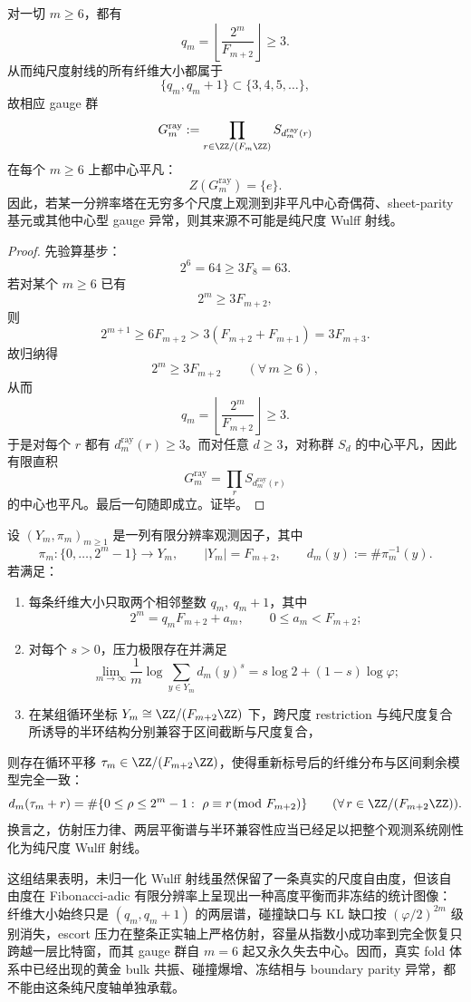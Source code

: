 \begin{proposition}\label{prop:conclusion-serrin-wulff-ray-eventual-centerless-gauge}
对一切 \(m\ge 6\)，都有
\[
q_m=\left\lfloor\frac{2^m}{F_{m+2}}\right\rfloor\ge 3.
\]
从而纯尺度射线的所有纤维大小都属于
\[
\{q_m,q_m+1\}\subset \{3,4,5,\dots\},
\]
故相应 gauge 群
\[
G_m^{\mathrm{ray}}
:=
\prod_{r\in \ZZ/(F_m\ZZ)}S_{d_m^{\mathrm{ray}}(r)}
\]
在每个 \(m\ge 6\) 上都中心平凡：
\[
Z(G_m^{\mathrm{ray}})=\{e\}.
\]
因此，若某一分辨率塔在无穷多个尺度上观测到非平凡中心奇偶荷、sheet-parity 基元或其他中心型 gauge 异常，则其来源不可能是纯尺度 Wulff 射线。
\end{proposition}
\begin{proof}
先验算基步：
\[
2^6=64\ge 3F_8=63.
\]
若对某个 \(m\ge 6\) 已有
\[
2^m\ge 3F_{m+2},
\]
则
\[
2^{m+1}\ge 6F_{m+2}>3(F_{m+2}+F_{m+1})=3F_{m+3}.
\]
故归纳得
\[
2^m\ge 3F_{m+2}
\qquad (\forall\,m\ge 6),
\]
从而
\[
q_m=\left\lfloor\frac{2^m}{F_{m+2}}\right\rfloor\ge 3.
\]
于是对每个 \(r\) 都有 \(d_m^{\mathrm{ray}}(r)\ge 3\)。而对任意 \(d\ge 3\)，对称群 \(S_d\) 的中心平凡，因此有限直积
\[
G_m^{\mathrm{ray}}=\prod_r S_{d_m^{\mathrm{ray}}(r)}
\]
的中心也平凡。最后一句随即成立。证毕。
\end{proof}

\begin{conjecture}\label{conj:conclusion-serrin-wulff-ray-balanced-twolevel-fibadic-rigidity}
设 \((Y_m,\pi_m)_{m\ge 1}\) 是一列有限分辨率观测因子，其中
\[
\pi_m:\{0,\dots,2^m-1\}\to Y_m,
\qquad
|Y_m|=F_{m+2},
\qquad
d_m(y):=\#\pi_m^{-1}(y).
\]
若满足：
\begin{enumerate}
  \item 每条纤维大小只取两个相邻整数 \(q_m,\ q_m+1\)，其中
  \[
  2^m=q_mF_{m+2}+a_m,
  \qquad
  0\le a_m<F_{m+2};
  \]
  \item 对每个 \(s>0\)，压力极限存在并满足
  \[
  \lim_{m\to\infty}\frac1m\log\sum_{y\in Y_m}d_m(y)^s
  =
  s\log2+(1-s)\log\varphi;
  \]
  \item 在某组循环坐标 \(Y_m\cong \ZZ/(F_{m+2}\ZZ)\) 下，跨尺度 restriction 与纯尺度复合所诱导的半环结构分别兼容于区间截断与尺度复合，
\end{enumerate}
则存在循环平移 \(\tau_m\in \ZZ/(F_{m+2}\ZZ)\)，使得重新标号后的纤维分布与区间剩余模型完全一致：
\[
d_m(\tau_m+r)
=
\#\{0\le \rho\le 2^m-1:\ \rho\equiv r\!\!\pmod{F_{m+2}}\}
\qquad
(\forall\,r\in \ZZ/(F_{m+2}\ZZ)).
\]
换言之，仿射压力律、两层平衡谱与半环兼容性应当已经足以把整个观测系统刚性化为纯尺度 Wulff 射线。
\end{conjecture}

\noindent
这组结果表明，未归一化 Wulff 射线虽然保留了一条真实的尺度自由度，但该自由度在 Fibonacci-adic 有限分辨率上呈现出一种高度平衡而非冻结的统计图像：纤维大小始终只是 \((q_m,q_m+1)\) 的两层谱，碰撞缺口与 KL 缺口按 \((\varphi/2)^{2m}\) 级别消失，escort 压力在整条正实轴上严格仿射，容量从指数小成功率到完全恢复只跨越一层比特窗，而其 gauge 群自 \(m=6\) 起又永久失去中心。因而，真实 fold 体系中已经出现的黄金 bulk 共振、碰撞爆增、冻结相与 boundary parity 异常，都不能由这条纯尺度轴单独承载。

\endinput
